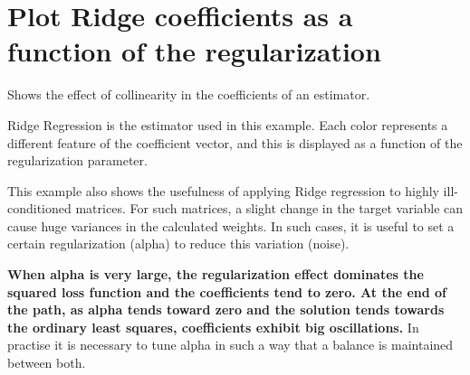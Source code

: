 \section{Plot Ridge coefficients as a function of the regularization\label{Plot Ridge coefficients as a function of the regularization}}
Shows the effect of collinearity in the coefficients of an estimator.

Ridge Regression is the estimator used in this example. Each color represents a different feature of the coefficient vector, and this is displayed as a function of the regularization parameter.

This example also shows the usefulness of applying Ridge regression to highly ill-conditioned matrices. For such matrices, a slight change in the target variable can cause huge variances in the calculated weights. In such cases, it is useful to set a certain regularization (alpha) to reduce this variation (noise).

\textbf{When alpha is very large, the regularization effect dominates the squared loss function and the coefficients tend to zero. At the end of the path, as alpha tends toward zero and the solution tends towards the ordinary least squares, coefficients exhibit big oscillations.} In practise it is necessary to tune alpha in such a way that a balance is maintained between both.

